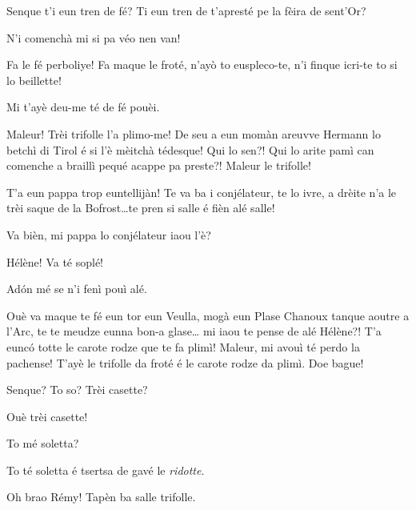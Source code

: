 \begin{drama}
\Cesarspeaks Senque t'i eun tren de fé? Ti eun tren de t'apresté pe la fèira de sent'Or?

\Helenespeaks N'i comenchà mi si pa véo nen van!

\Cesarspeaks{} Fa le fé perboliye! Fa maque le froté, n'ayò to euspleco-te, n'i finque icri-te to si lo beillette! 

\Helenespeaks Mi t'ayè deu-me té de fé pouèi.

\Cesarspeaks{} Maleur! Trèi trifolle l'a plimo-me! De seu a eun momàn areuvve Hermann lo betchì di Tirol é si l'è mèitchà tédesque! Qui lo sen?! Qui lo arite pamì can comenche a braillì pequé acappe pa preste?! Maleur le trifolle!


\Cesarspeaks{} T'a eun pappa trop euntellijàn! Te va ba i conjélateur, te lo ivre, a drèite n'a le trèi saque de la Bofrost\ldots te pren si salle é fièn alé salle!

\Helenespeaks Va bièn, mi pappa lo conjélateur iaou l'è?

\Cesarspeaks{} Hélène! Va té soplé!

 
\Helenespeaks  Ad\'on mé se n'i fenì pouì alé.

\Cesarspeaks{} Ouè va maque te fé eun tor eun Veulla, mogà eun Plase Chanoux tanque aoutre a l'Arc, te te meudze eunna bon-a glase\ldots {} mi iaou te pense de alé Hélène?! T'a eunc\'o totte le carote rodze que te fa plimì! Maleur, mi avouì té perdo la pachense! T'ayè le trifolle da froté é le carote rodze da plimì. Doe bague!


\Helenespeaks Senque? To so? Trèi casette?

\Cesarspeaks Ouè trèi casette!

\Helenespeaks To mé soletta?

\Cesarspeaks To té soletta é tsertsa de gavé le \textit{ridotte}.


\Cesarspeaks Oh brao Rémy! Tapèn ba salle trifolle.


\end{drama}
